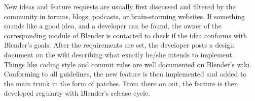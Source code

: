 New ideas and feature requests are usually first discussed and filtered by the community in forums, blogs, podcasts, or brain-storming websites.\cite{blender-community} If something sounds like a good idea, and a developer can be found, the owner of the corresponding module of Blender is contacted to check if the idea conforms with Blender's goals. After the requirements are set, the developer posts a design document on the wiki describing what exactly he/she intends to implement.\cite{blender-new-devs} Things like coding style\cite{blender-style-rules} and commit rules\cite{blender-new-devs} are well documented on Blender's wiki. Conforming to all guidelines, the new feature is then implemented and added to the main trunk in the form of patches. From there on out, the feature is then developed regularly with Blender's release cycle.

